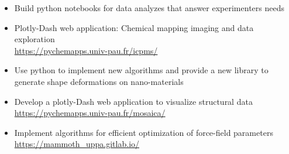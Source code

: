 \documentclass[10pt,a4paper,ragged2e,academicons]{../altacv}
\begin{document}
\medskip

\vspace{-2mm}
\begin{itemize}\setlength{\itemsep}{0ex}
    \item Build python notebooks for data analyzes that answer experimenters needs
    \item Plotly-Dash web application: Chemical mapping imaging and data exploration\\
    \url{https://pychemapps.univ-pau.fr/icpms/}
\end{itemize}

\medskip

\vspace{-2mm}
\begin{itemize}\setlength{\itemsep}{0ex}
    \item Use python to implement new algorithms and provide a new library to generate shape deformations on nano-materials
    \item Develop a plotly-Dash web application to visualize structural data\\
    \url{https://pychemapps.univ-pau.fr/mosaica/}
\end{itemize}


\medskip

\vspace{-2mm}
\begin{itemize}\setlength{\itemsep}{0ex}
    \item Implement algorithms for efficient optimization of force-field parameters\\
    \url{https://mammoth_uppa.gitlab.io/}
\end{itemize}
\end{document}
